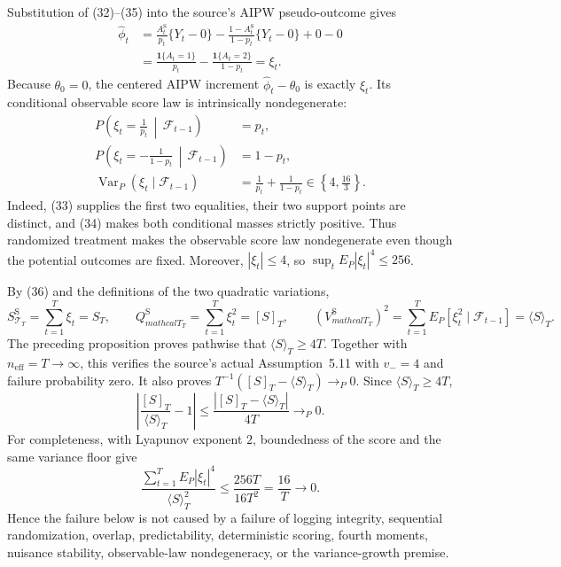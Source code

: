 Substitution of (32)--(35) into the source's AIPW pseudo-outcome gives
\[
 \begin{aligned}
 \widehat\phi_t
 &=\frac{A_t^{\mathrm S}}{p_t}\{Y_t-0\}
   -\frac{1-A_t^{\mathrm S}}{1-p_t}\{Y_t-0\}+0-0\\
 &=\frac{\mathbf1\{A_t=1\}}{p_t}
   -\frac{\mathbf1\{A_t=2\}}{1-p_t}
 =\xi_t.
 \end{aligned}
\tag{36}
\]
Because \(\theta_0=0\), the centered AIPW increment \(\widehat\phi_t-\theta_0\) is exactly \(\xi_t\). Its conditional observable score law is intrinsically nondegenerate:
\[
 \begin{aligned}
 P\!\left(\xi_t=\frac1{p_t}\,\middle|\,\mathcal F_{t-1}\right)&=p_t,\\
 P\!\left(\xi_t=-\frac1{1-p_t}\,\middle|\,\mathcal F_{t-1}\right)&=1-p_t,\\
 \operatorname{Var}_P(\xi_t\mid\mathcal F_{t-1})
 &=\frac1{p_t}+\frac1{1-p_t}\in\left\{4,\frac{16}{3}\right\}.
 \end{aligned}
\tag{37}
\]
Indeed, (33) supplies the first two equalities, their two support points are distinct, and (34) makes both conditional masses strictly positive. Thus randomized treatment makes the observable score law nondegenerate even though the potential outcomes are fixed. Moreover, \(|\xi_t|\le4\), so \(\sup_tE_P|\xi_t|^4\le256\).

By (36) and the definitions of the two quadratic variations,
\[
 S_{\mathcal T_T}^{\mathrm S}=\sum_{t=1}^T\xi_t=S_T,
 \qquad
 Q_{mathcal T_T}^{\mathrm S}=\sum_{t=1}^T\xi_t^2=[S]_T,
 \qquad
 (V_{mathcal T_T}^{\mathrm S})^2
 =\sum_{t=1}^TE_P[\xi_t^2\mid\mathcal F_{t-1}]
 =\langle S\rangle_T.
\tag{38}
\]
The preceding proposition proves pathwise that \(\langle S\rangle_T\ge4T\). Together with \(n_{\mathrm{eff}}=T\to\infty\), this verifies the source's actual Assumption~5.11 with \(v_-=4\) and failure probability zero. It also proves \(T^{-1}([S]_T-\langle S\rangle_T)\to_P0\). Since \(\langle S\rangle_T\ge4T\),
\[
 \left|\frac{[S]_T}{\langle S\rangle_T}-1\right|
 \le\frac{|[S]_T-\langle S\rangle_T|}{4T}\to_P0.
\tag{39}
\]
For completeness, with Lyapunov exponent \(2\), boundedness of the score and the same variance floor give
\[
 \frac{\sum_{t=1}^TE_P|\xi_t|^4}{\langle S\rangle_T^2}
 \le\frac{256T}{16T^2}=\frac{16}{T}\longrightarrow0.
\tag{40}
\]
Hence the failure below is not caused by a failure of logging integrity, sequential randomization, overlap, predictability, deterministic scoring, fourth moments, nuisance stability, observable-law nondegeneracy, or the variance-growth premise.

